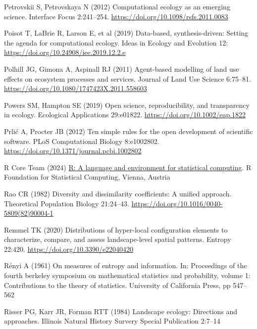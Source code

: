 \documentclass[
  10pt,
  a4paperpaper,
]{article}
\newlength{\cslhangindent}
\newenvironment{CSLReferences}[2] %
 {\begin{list}{}{%
  \setlength{\itemindent}{0pt}
  \setlength{\leftmargin}{0pt}
  \setlength{\parsep}{0pt}
  \ifodd #1
   \setlength{\leftmargin}{\cslhangindent}
   \setlength{\itemindent}{-1\cslhangindent}
  \fi
  \setlength{\itemsep}{#2\baselineskip}}}
 {\end{list}}
\begin{document}
\begin{CSLReferences}{1}{1}
Petrovskii S, Petrovskaya N (2012) Computational ecology as an emerging
science. Interface Focus 2:241--254.
\url{https://doi.org/10.1098/rsfs.2011.0083}

Poisot T, LaBrie R, Larson E, et al (2019) Data-based, synthesis-driven:
Setting the agenda for computational ecology. Ideas in Ecology and
Evolution 12: \url{https://doi.org/10.24908/iee.2019.12.2.e}

Polhill JG, Gimona A, Aspinall RJ (2011) Agent-based modelling of land
use effects on ecosystem processes and services. Journal of Land Use
Science 6:75--81. \url{https://doi.org/10.1080/1747423X.2011.558603}

Powers SM, Hampton SE (2019) Open science, reproducibility, and
transparency in ecology. Ecological Applications 29:e01822.
\url{https://doi.org/10.1002/eap.1822}

Prlić A, Procter JB (2012) Ten simple rules for the open development of
scientific software. PLoS Computational Biology 8:e1002802.
\url{https://doi.org/10.1371/journal.pcbi.1002802}

R Core Team (2024) \href{https://www.R-project.org/}{R: A language and
environment for statistical computing}. R Foundation for Statistical
Computing, Vienna, Austria

Rao CR (1982) Diversity and dissimilarity coefficients: A unified
approach. Theoretical Population Biology 21:24--43.
\url{https://doi.org/10.1016/0040-5809(82)90004-1}

Remmel TK (2020) Distributions of hyper-local configuration elements to
characterize, compare, and assess landscape-level spatial patterns.
Entropy 22:420. \url{https://doi.org/10.3390/e22040420}

Rényi A (1961) On measures of entropy and information. In: Proceedings
of the fourth berkeley symposium on mathematical statistics and
probability, volume 1: Contributions to the theory of statistics.
University of California Press, pp 547--562

Risser PG, Karr JR, Forman RTT (1984) Landscape ecology: Directions and
approaches. Illinois Natural History Survery Special Publication 2:7--14


\end{CSLReferences}
\end{document}
